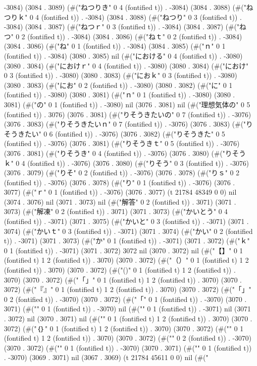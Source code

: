 -3084) (3084 . 3089) (#("ねつりき" 0 4 (fontified t)) . -3084) (3084 . 3088) (#("ねつりｋ" 0 4 (fontified t)) . -3084) (3084 . 3088) (#("ねつり" 0 3 (fontified t)) . -3084) (3084 . 3087) (#("ねつｒ" 0 3 (fontified t)) . -3084) (3084 . 3087) (#("ねつ" 0 2 (fontified t)) . -3084) (3084 . 3086) (#("ねｔ" 0 2 (fontified t)) . -3084) (3084 . 3086) (#("ね" 0 1 (fontified t)) . -3084) (3084 . 3085) (#("ｎ" 0 1 (fontified t)) . -3084) (3080 . 3085) nil (#("における" 0 4 (fontified t)) . -3080) (3080 . 3084) (#("におけｒ" 0 4 (fontified t)) . -3080) (3080 . 3084) (#("におけ" 0 3 (fontified t)) . -3080) (3080 . 3083) (#("におｋ" 0 3 (fontified t)) . -3080) (3080 . 3083) (#("にお" 0 2 (fontified t)) . -3080) (3080 . 3082) (#("に" 0 1 (fontified t)) . -3080) (3080 . 3081) (#("ｎ" 0 1 (fontified t)) . -3080) (3080 . 3081) (#("の" 0 1 (fontified t)) . -3080) nil (3076 . 3081) nil (#("理想気体の" 0 5 (fontified t)) . 3076) (3076 . 3081) (#("りそうきたいの" 0 7 (fontified t)) . -3076) (3076 . 3083) (#("りそうきたいｎ" 0 7 (fontified t)) . -3076) (3076 . 3083) (#("りそうきたい" 0 6 (fontified t)) . -3076) (3076 . 3082) (#("りそうきた" 0 5 (fontified t)) . -3076) (3076 . 3081) (#("りそうきｔ" 0 5 (fontified t)) . -3076) (3076 . 3081) (#("りそうき" 0 4 (fontified t)) . -3076) (3076 . 3080) (#("りそうｋ" 0 4 (fontified t)) . -3076) (3076 . 3080) (#("りそう" 0 3 (fontified t)) . -3076) (3076 . 3079) (#("りそ" 0 2 (fontified t)) . -3076) (3076 . 3078) (#("りｓ" 0 2 (fontified t)) . -3076) (3076 . 3078) (#("り" 0 1 (fontified t)) . -3076) (3076 . 3077) (#("ｒ" 0 1 (fontified t)) . -3076) (3076 . 3077) (t 21784 48349 0 0) nil (3074 . 3076) nil (3071 . 3073) nil (#("解答" 0 2 (fontified t)) . 3071) (3071 . 3073) (#("解凍" 0 2 (fontified t)) . 3071) (3071 . 3073) (#("かいとう" 0 4 (fontified t)) . -3071) (3071 . 3075) (#("かいと" 0 3 (fontified t)) . -3071) (3071 . 3074) (#("かいｔ" 0 3 (fontified t)) . -3071) (3071 . 3074) (#("かい" 0 2 (fontified t)) . -3071) (3071 . 3073) (#("か" 0 1 (fontified t)) . -3071) (3071 . 3072) (#("ｋ" 0 1 (fontified t)) . -3071) (3071 . 3072) 3072 nil (3070 . 3072) nil (#("【】" 0 1 (fontified t) 1 2 (fontified t)) . 3070) (3070 . 3072) (#("（）" 0 1 (fontified t) 1 2 (fontified t)) . 3070) (3070 . 3072) (#("()" 0 1 (fontified t) 1 2 (fontified t)) . 3070) (3070 . 3072) (#("「」" 0 1 (fontified t) 1 2 (fontified t)) . 3070) (3070 . 3072) (#("『』" 0 1 (fontified t) 1 2 (fontified t)) . 3070) (3070 . 3072) (#("「」" 0 2 (fontified t)) . -3070) (3070 . 3072) (#("「" 0 1 (fontified t)) . -3070) (3070 . 3071) (#("{" 0 1 (fontified t)) . -3070) nil (#("}" 0 1 (fontified t)) . -3071) nil (3071 . 3072) nil (3070 . 3071) nil (#("{}" 0 1 (fontified t) 1 2 (fontified t)) . 3070) (3070 . 3072) (#("｛｝" 0 1 (fontified t) 1 2 (fontified t)) . 3070) (3070 . 3072) (#("{}" 0 1 (fontified t) 1 2 (fontified t)) . 3070) (3070 . 3072) (#("{}" 0 2 (fontified t)) . -3070) (3070 . 3072) (#("{" 0 1 (fontified t)) . -3070) (3070 . 3071) (#("{" 0 1 (fontified t)) . -3070) (3069 . 3071) nil (3067 . 3069) (t 21784 45611 0 0) nil (#("
}}
